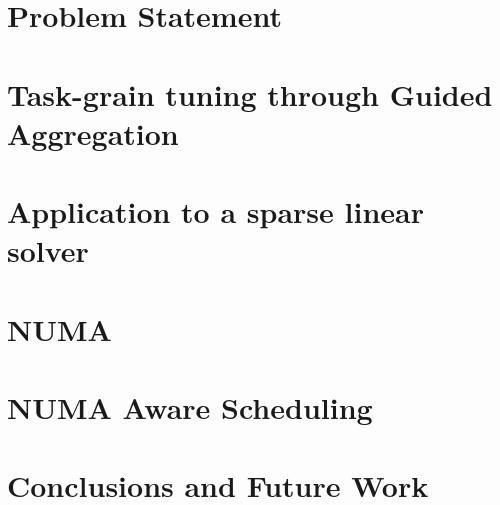 \documentclass[10pt, conference, compsocconf]{IEEEtran}
\begin{document}
\section{Problem Statement}\label{sec:problem}


\section{Task-grain tuning through Guided Aggregation}\label{sec:proposal}


\section{Application to a sparse linear solver}\label{sec:appli}


\section{NUMA}\label{sec:numa}


\section{NUMA Aware Scheduling}\label{sec:numa_sched}


\section{Conclusions and Future Work}\label{sec:conclusion}





\end{document}
